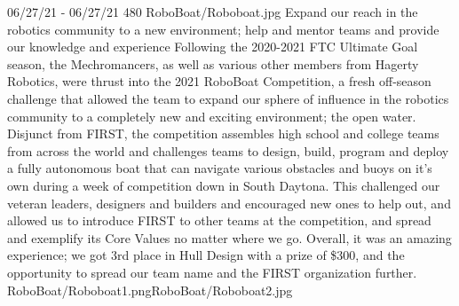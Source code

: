 {06/27/21 - 06/27/21}
{480}
{RoboBoat/Roboboat.jpg}
{Expand our reach in the robotics community to a new environment; help and mentor teams and provide our knowledge and experience}
{
Following the 2020-2021 FTC Ultimate Goal season, the Mechromancers, as well as various other members from Hagerty Robotics, were thrust into the 2021 RoboBoat Competition, a fresh off-season challenge that allowed the team to expand our sphere of influence in the robotics community to a completely new and exciting environment; the open water. Disjunct from FIRST, the competition assembles high school and college teams from across the world and challenges teams to design, build, program and deploy a fully autonomous boat that can navigate various obstacles and buoys on it's own during a week of competition down in South Daytona. This challenged our veteran leaders, designers and builders and encouraged new ones to help out, and allowed us to introduce FIRST to other teams at the competition, and spread and exemplify its Core Values no matter where we go. Overall, it was an amazing experience; we got 3rd place in Hull Design with a prize of \$300, and the opportunity to spread our team name and the FIRST organization further. 
}
{RoboBoat/Roboboat1.png}{RoboBoat/Roboboat2.jpg}